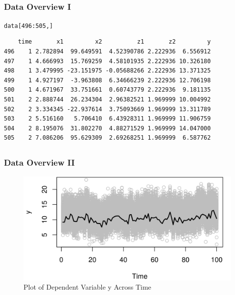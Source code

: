 \documentclass{beamer}\usepackage[]{graphicx}\usepackage[]{color}
\makeatletter
\def\maxwidth{ %
  \ifdim\Gin@nat@width>\linewidth
    \linewidth
  \else
    \Gin@nat@width
  \fi
}
\newcommand{\hlnum}[1]{\textcolor[rgb]{0.686,0.059,0.569}{#1}}%
\newcommand{\hlopt}[1]{\textcolor[rgb]{0,0,0}{#1}}%
\newcommand{\hlstd}[1]{\textcolor[rgb]{0.345,0.345,0.345}{#1}}%
\newenvironment{kframe}{%
 \def\at@end@of@kframe{}%
 \ifinner\ifhmode%
  \def\at@end@of@kframe{\end{minipage}}%
  \begin{minipage}{\columnwidth}%
 \fi\fi%
 \def\FrameCommand##1{\hskip\@totalleftmargin \hskip-\fboxsep
 \colorbox{shadecolor}{##1}\hskip-\fboxsep
     \hskip-\linewidth \hskip-\@totalleftmargin \hskip\columnwidth}%
 \MakeFramed {\advance\hsize-\width
   \@totalleftmargin\z@ \linewidth\hsize
   \@setminipage}}%
 {\par\unskip\endMakeFramed%
 \at@end@of@kframe}
\newenvironment{knitrout}{}{} %
\makeatother
\begin{document}
\subsection{}
\begin{frame}[fragile]%
\frametitle{Data Overview I}
\begin{knitrout}
\color{fgcolor}\begin{kframe}
\begin{alltt}
\hlstd{data[}\hlnum{496}\hlopt{:}\hlnum{505}\hlstd{,]}
\end{alltt}
\begin{verbatim}
    time       x1         x2          z1       z2         y
496    1 2.782894  99.649591  4.52390786 2.222936  6.556912
497    1 4.666993  15.769259  4.58101935 2.222936 10.326180
498    1 3.479995 -23.151975 -0.05688266 2.222936 13.371325
499    1 4.927197  -3.963808  6.34666239 2.222936 12.706198
500    1 4.671967  33.751661  0.60743779 2.222936  9.181135
501    2 2.888744  26.234304  2.96382521 1.969999 10.004992
502    2 3.334345 -22.937614  3.75093669 1.969999 13.311789
503    2 5.516160   5.706410  6.43928311 1.969999 11.906759
504    2 8.195076  31.802270  4.88271529 1.969999 14.047000
505    2 7.086206  95.629309  2.69268251 1.969999  6.587762
\end{verbatim}
\end{kframe}
\end{knitrout}
\end{frame}

\subsection{}
\begin{frame}%
\frametitle{Data Overview II}
\begin{figure}[ht]\centering
\caption{Plot of Dependent Variable y Across Time}
\begin{knitrout}
\color{fgcolor}
\includegraphics[width=\maxwidth]{figure/d-1} 

\end{knitrout}
\end{figure}
\end{frame}
\end{document}
